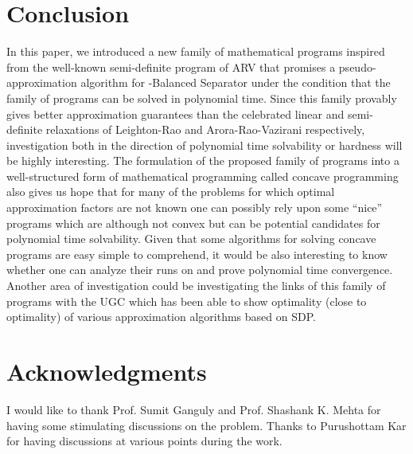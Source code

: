 \documentclass [11pt,a4paper]{article}
\begin{document}
\section{Conclusion}
In this paper, we introduced a new family of mathematical programs inspired from the
well-known semi-definite program of {\sf ARV} that promises a 
 pseudo-approximation 
algorithm for -{\sc Balanced Separator} under the condition that the family 
of programs can be solved in polynomial time. Since this family provably gives better 
approximation guarantees than the celebrated linear and semi-definite relaxations
of Leighton-Rao \cite{LR99} and Arora-Rao-Vazirani \cite{ARV} respectively, 
investigation both in the direction of polynomial time solvability 
or hardness will be highly interesting. The formulation of the proposed family of programs
into a well-structured form of mathematical programming called concave programming
also gives us hope that for many of the problems for which optimal approximation factors
are not known one can possibly rely upon some ``nice'' programs 
which are although not convex but can be potential candidates for 
polynomial time solvability. Given that some algorithms for 
solving concave programs are easy simple to comprehend, it would be also 
interesting to know whether one can analyze their runs on  
and prove polynomial time convergence. Another area of investigation could be investigating the  
links of this family of programs with the {\sc UGC} 
which has been able to show optimality (close to optimality) of various approximation algorithms based on SDP. \\

\section{Acknowledgments}
I would like to thank Prof. Sumit Ganguly and Prof. Shashank K. Mehta
for having some stimulating discussions on the problem. Thanks to Purushottam 
Kar for having discussions at various points during the work.
\end{document}
